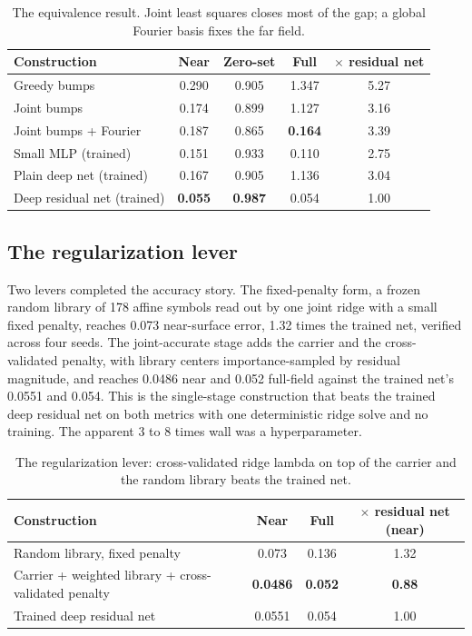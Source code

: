 \documentclass[11pt]{article}
\begin{document}
\begin{table}[t]
\centering
\small
\begin{tabular}{lcccc}
\toprule
Construction & Near & Zero-set & Full & $\times$ residual net \\
\midrule
Greedy bumps                 & 0.290 & 0.905 & 1.347 & 5.27 \\
Joint bumps                  & 0.174 & 0.899 & 1.127 & 3.16 \\
Joint bumps + Fourier        & 0.187 & 0.865 & \textbf{0.164} & 3.39 \\
Small MLP (trained)          & 0.151 & 0.933 & 0.110 & 2.75 \\
Plain deep net (trained)     & 0.167 & 0.905 & 1.136 & 3.04 \\
Deep residual net (trained)  & \textbf{0.055} & \textbf{0.987} & 0.054 & 1.00 \\
\bottomrule
\end{tabular}
\caption{The equivalence result. Joint least squares closes
most of the gap; a global Fourier basis fixes the far field.}
\label{tab:equivalence}
\end{table}

\subsection{The regularization lever}

Two levers completed the accuracy story. The fixed-penalty form,
a frozen random library of 178 affine symbols read out by one
joint ridge with a small fixed penalty, reaches 0.073
near-surface error, 1.32 times the trained net, verified across
four seeds. The joint-accurate stage adds the carrier and the
cross-validated penalty, with library centers importance-sampled
by residual magnitude, and reaches 0.0486 near and 0.052
full-field against the trained net's 0.0551 and 0.054.
This is the single-stage construction that beats the trained deep
residual net on both metrics with one deterministic ridge solve and
no training. The apparent 3 to 8 times wall was a hyperparameter.

\begin{table}[t]
\centering
\small
\begin{tabular}{lccc}
\toprule
Construction & Near & Full & $\times$ residual net (near) \\
\midrule
Random library, fixed penalty & 0.073 & 0.136 & 1.32 \\
Carrier + weighted library + cross-validated penalty & \textbf{0.0486} & \textbf{0.052} & \textbf{0.88} \\
Trained deep residual net & 0.0551 & 0.054 & 1.00 \\
\bottomrule
\end{tabular}
\caption{The regularization lever: cross-validated ridge lambda on
top of the carrier and the random library beats the trained net.}
\label{tab:d3}
\end{table}
\end{document}
